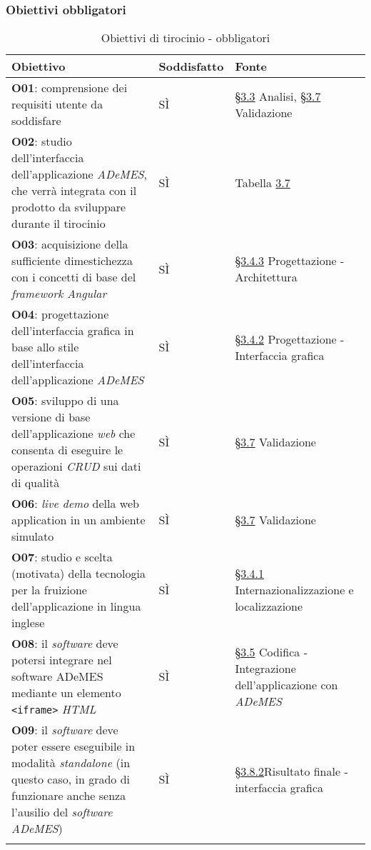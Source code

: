\subsubsection*{Obiettivi obbligatori}
\begin{longtable}{>{\centering\arraybackslash}m{}>{\centering\arraybackslash}m{}>{\centering\arraybackslash}m{}}
    \hline
    \rowcolor{black}
    \color{white}\textbf{Obiettivo} & \color{white}\textbf{Soddisfatto} & \color{white}\textbf{Fonte} \\
    \hline
    \endhead %
    \textbf{O01}: comprensione dei requisiti utente da soddisfare & SÌ & \hyperref[sec:analisi]{§3.3} Analisi, \hyperref[sec:validazione]{§3.7} Validazione \\
    \hline
    \textbf{O02}: studio dell’interfaccia dell’applicazione \textit{ADeMES}, che verrà integrata con il prodotto da sviluppare durante il tirocinio & SÌ & Tabella \hyperref[tab:colors]{3.7} \\
    \hline
    \textbf{O03}: acquisizione della sufficiente dimestichezza con i concetti di base del \textit{framework Angular} & SÌ & \hyperref[subsec:architettura]{§3.4.3} Progettazione - Architettura \\
    \hline
    \textbf{O04}: progettazione dell'interfaccia grafica in base allo stile dell'interfaccia dell'applicazione \textit{ADeMES} & SÌ & \hyperref[subsec:interfaccia]{§3.4.2} Progettazione - Interfaccia grafica  \\
    \hline
    \textbf{O05}: sviluppo di una versione di base dell'applicazione \textit{web} che consenta di eseguire le operazioni \textit{CRUD} sui dati di qualità & SÌ & \hyperref[sec:validazione]{§3.7} Validazione \\
    \hline
    \textbf{O06}: \textit{live demo} della web application in un ambiente simulato & SÌ & \hyperref[sec:validazione]{§3.7} Validazione \\
    \hline
    \textbf{O07}: studio e scelta (motivata) della tecnologia per la fruizione dell'applicazione in lingua inglese & SÌ & \hyperref[subsec:internazionalizzazione]{§3.4.1} Internazionalizzazione e localizzazione \\
    \hline
    \textbf{O08}: il \textit{software} deve potersi integrare nel software ADeMES mediante un elemento \texttt{<iframe>} \textit{HTML} & SÌ & \hyperref[subsec:integrazione]{§3.5} Codifica - Integrazione dell'applicazione con \textit{ADeMES}\\
    \hline
    \textbf{O09}: il \textit{software} deve poter essere eseguibile in modalità \textit{standalone} (in questo caso, in grado di funzionare anche senza l'ausilio del \textit{software ADeMES}) & SÌ & \hyperref[subsec:interfaccia-risultato]{§3.8.2}Risultato finale - interfaccia grafica \\
    \hline
    \caption{Obiettivi di tirocinio - obbligatori}
\end{longtable}


